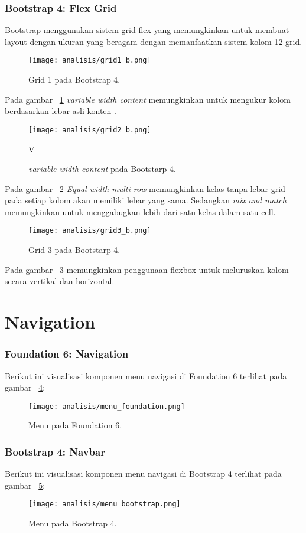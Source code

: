 \subsubsection{Bootstrap 4: Flex Grid}
Bootstrap menggunakan sistem grid flex yang memungkinkan untuk membuat layout dengan ukuran yang beragam dengan memanfaatkan sistem kolom 12-grid.\\
\begin{figure} [H]
	\centering  
	\texttt{[image: analisis/grid1\_b.png]}
	\caption{Grid 1 pada Bootstrap 4.}
	\label{fig:grid1b}
\end{figure}
Pada gambar ~\ref{fig:grid1b} \textit{variable width content} memungkinkan untuk mengukur kolom berdasarkan lebar asli konten .
\begin{figure} [H]
	\centering  
	\texttt{[image: analisis/grid2\_b.png]}
	\caption{\textit{variable width content} pada Bootstarp 4.}
	\label{fig:grid2b}V\end{figure}
Pada gambar ~\ref{fig:grid2b} \textit{Equal width multi row } memungkinkan kelas tanpa lebar grid pada setiap kolom akan memiliki lebar yang sama. Sedangkan \textit{mix and match} memungkinkan untuk menggabugkan lebih dari satu kelas dalam satu cell.
\begin{figure} [H]
	\centering  
	\texttt{[image: analisis/grid3\_b.png]}
	\caption{Grid 3 pada Bootstarp 4.}
	\label{fig:grid3b}
\end{figure}
Pada gambar ~\ref{fig:grid3b} memungkinkan penggunaan flexbox untuk meluruskan kolom secara vertikal dan horizontal.

\section{Navigation}
\subsubsection{Foundation 6: Navigation}
Berikut ini visualisasi komponen menu navigasi di Foundation 6 terlihat pada gambar ~\ref{fig:menuFoundation}:
\begin{figure} [H]
	\centering  
	\texttt{[image: analisis/menu\_foundation.png]}  
	\caption{Menu pada Foundation 6.}
	\label{fig:menuFoundation}	 
\end{figure}

\subsubsection{Bootstrap 4: Navbar}
Berikut ini visualisasi komponen menu navigasi di Bootstrap 4 terlihat pada gambar ~\ref{fig:menuBootstrap}:
\begin{figure} [H]
	\centering  
	\texttt{[image: analisis/menu\_bootstrap.png]}  
	\caption{Menu pada Bootstrap 4.}
	\label{fig:menuBootstrap}	 
\end{figure}


